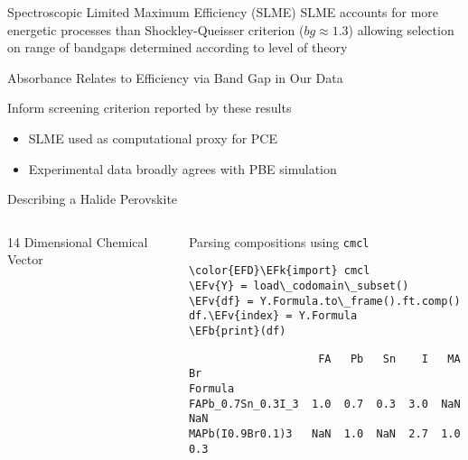 \documentclass[10pt, aspectratio=169, presentation]{beamer}
\newcommand{\EFk}[1]{\textcolor{EFk}{#1}} %
\newcommand{\EFb}[1]{\textcolor{EFb}{#1}} %
\newcommand{\EFv}[1]{\textcolor{EFv}{#1}} %
\begin{document}
\begin{frame}[label={sec:orgf79f465}]{Spectroscopic Limited Maximum Efficiency (SLME)}
SLME accounts for more energetic processes than Shockley-Queisser
criterion (\(bg \approx 1.3\)) allowing selection on range of bandgaps
determined according to level of theory\autocite[p.1]{yu-2012-ident-poten}
\end{frame}

\begin{frame}[label={sec:orgd1ff410}]{Absorbance Relates to Efficiency via Band Gap in Our Data}
 
\begin{center}

\end{center}

Inform screening criterion reported by these results\autocite{yang-2023-high-throug} 
\begin{itemize}
\item SLME used as computational proxy for PCE
\item Experimental data\autocite{almora-2020-devic-perfor} broadly agrees with PBE simulation
\end{itemize}
\end{frame}

\begin{frame}[label={sec:orgfac5fd6},fragile]{Describing a Halide Perovskite}
 \begin{columns}
\begin{column}{0.4\columnwidth}
\begin{block}{14 Dimensional Chemical Vector}
 
\begin{center}

\end{center}
\end{block}
\end{column}

\begin{column}{0.6\columnwidth}
\begin{block}{Parsing compositions using \texttt{cmcl}}
\begin{Code}
\begin{Verbatim}
\color{EFD}\EFk{import} cmcl
\EFv{Y} = load\_codomain\_subset()
\EFv{df} = Y.Formula.to\_frame().ft.comp()
df.\EFv{index} = Y.Formula
\EFb{print}(df)
\end{Verbatim}
\end{Code}

\begin{small}
\begin{verbatim}
                    FA   Pb   Sn    I   MA   Br
Formula                                        
FAPb_0.7Sn_0.3I_3  1.0  0.7  0.3  3.0  NaN  NaN
MAPb(I0.9Br0.1)3   NaN  1.0  NaN  2.7  1.0  0.3
\end{verbatim}
\end{small}
\end{block}
\end{column}
\end{columns}
\end{frame}
\end{document}
